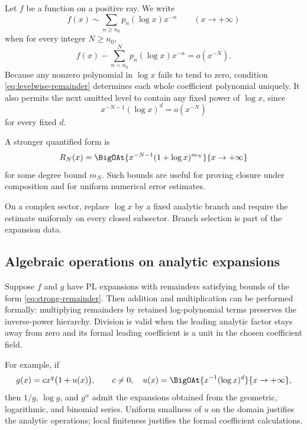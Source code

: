 \documentclass[11pt,oneside]{article}
\numberwithin{equation}{section}
\theoremstyle{definition}
\newcommand{\as}{\sim}
\begin{document}
Let \(f\) be a function on a positive ray.  We write
\begin{equation}\label{eq:analytic-PL-expansion}
  f(x)\as\sum_{n\ge n_0}p_n(\log x)x^{-n}
  \qquad(x\to+\infty)
\end{equation}
when for every integer \(N\ge n_0\),
\begin{equation}\label{eq:levelwise-remainder}
  f(x)-\sum_{n=n_0}^{N}p_n(\log x)x^{-n}
  =o(x^{-N}).
\end{equation}
Because any nonzero polynomial in \(\log x\) fails to tend to zero, condition
\eqref{eq:levelwise-remainder} determines each whole coefficient polynomial
uniquely.  It also permits the next omitted level to contain any fixed power of
\(\log x\), since
\[
  x^{-N-1}(\log x)^d=o(x^{-N})
\]
for every fixed \(d\).

A stronger quantified form is
\begin{equation}\label{eq:strong-remainder}
  R_N(x)=\BigOAt{x^{-N-1}(1+\log x)^{m_N}}{x\to+\infty}
\end{equation}
for some degree bound \(m_N\).  Such bounds are useful for proving closure under
composition and for uniform numerical error estimates.

On a complex sector, replace \(\log x\) by a fixed analytic branch and require
the estimate uniformly on every closed subsector.  Branch selection is part of
the expansion data.

\subsection{Algebraic operations on analytic expansions}

Suppose \(f\) and \(g\) have PL expansions with remainders satisfying bounds of
the form \eqref{eq:strong-remainder}.  Then addition and multiplication can be
performed formally: multiplying remainders by retained log-polynomial terms
preserves the inverse-power hierarchy.  Division is valid when the leading
analytic factor stays away from zero and its formal leading coefficient is a
unit in the chosen coefficient field.

For example, if
\[
  g(x)=c x^q\bigl(1+u(x)\bigr),
  \qquad c\ne0,\quad
  u(x)=\BigOAt{x^{-1}(\log x)^d}{x\to+\infty},
\]
then \(1/g\), \(\log g\), and \(g^\alpha\) admit the expansions obtained from
the geometric, logarithmic, and binomial series.  Uniform smallness of \(u\) on
the domain justifies the analytic operations; local finiteness justifies the
formal coefficient calculations.
\end{document}
